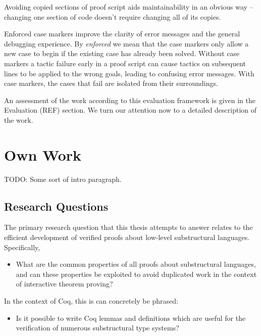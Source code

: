 \documentclass[]{unswthesis}
\let\i\textit
\begin{document}
Avoiding copied sections of proof script aids maintainability in an obvious way -- changing one section of code doesn't require changing all of its copies.

Enforced case markers improve the clarity of error messages and the general debugging experience. By \i{enforced} we mean that the case markers only allow a new case to begin if the existing case has already been solved. Without case markers a tactic failure early in a proof script can cause tactics on subsequent lines to be applied to the wrong goals, leading to confusing error messages. With case markers, the cases that fail are isolated from their surroundings.

An assessment of the work according to this evaluation framework is given in the Evaluation (REF) section. We turn our attention now to a detailed description of the work.

\chapter{Own Work}

TODO: Some sort of intro paragraph.

\section{Research Questions}

The primary research question that this thesis attempts to answer relates to the efficient development of verified proofs about low-level substructural languages. Specifically,

\begin{itemize}
\item What are the common properties of all proofs about substructural languages, and can these properties be exploited to avoid duplicated work in the context of interactive theorem proving?
\end{itemize}

In the context of Coq, this is can concretely be phrased:

\begin{itemize}
\item Is it possible to write Coq lemmas and definitions which are useful for the verification of numerous substructural type systems?
\end{itemize}


\end{document}
